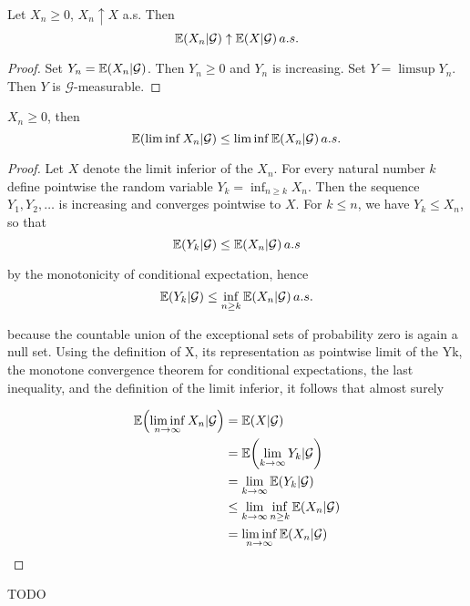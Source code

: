 \begin{thm}  Let $X_{n} \geq 0$,
  $X_{n} \uparrow X$ a.s.  Then
  \begin{equation}
    \label{exmp:general:7}
    \E{X_{n} | \mathcal{G}} \uparrow \E{X | \mathcal{G}} a.s.
  \end{equation} 
\end{thm}

\begin{proof}
  Set $Y_{n} = \E{X_{n} | \mathcal{G}}$.  Then $Y_{n} \geq 0$ and
    $Y_{n}$ is increasing.  Set $Y  = \limsup Y_{n}$.  Then $Y$ is
    $\mathcal{G}$-measurable.  
\end{proof}

\begin{thm}  $X_{n} \geq 0$, then
  \begin{equation}
    \label{exmp:general:8}
    \E{\liminf X_{n} | \mathcal{G}} \leq \liminf \E{X_{n} |
      \mathcal{G}} a.s.
  \end{equation}
\end{thm}

\begin{proof}
  Let $X$ denote the limit inferior of the $X_{n}$. For every natural number
  $k$ define pointwise the random variable $Y_k= \inf_{n \geq k} X_n$.
  Then the sequence $Y_{1}, Y_{2}, \dots$ is increasing and converges pointwise
  to $X$. For $k \leq n$, we have $Y_{k} \leq X_{n}$, so that 
  \begin{equation}
    \label{eq:6}
    \E{Y_k | \mathcal{G}} \leq \E{X_n | \mathcal{G}} a.s
  \end{equation}

  by the monotonicity of conditional expectation, hence
  \begin{equation}
    \label{eq:7}
    \E{Y_k|\mathcal{G}} \leq \inf_{n \geq k} \E{X_n | \mathcal{G}} a.s.
  \end{equation}

  because the countable union of the exceptional sets of probability
  zero is again a null set. Using the definition of X, its
  representation as pointwise limit of the Yk, the monotone convergence
  theorem for conditional expectations, the last inequality, and the
  definition of the limit inferior, it follows that almost surely

  \begin{align}
  \E{\liminf_{n \rightarrow \infty} X_{n} | \mathcal{G}} 
 & = \E{X |
    \mathcal{G}}                                         \\
 & = \E{\lim_{k \rightarrow \infty} Y_{k} | \mathcal{G}} \\
 & = \lim_{k \rightarrow \infty} \E{Y_{k} | \mathcal{G}} \\
 & \leq \lim_{k \rightarrow \infty} \inf_{n \geq k} \E{X_{n} |
    \mathcal{G}}                                         \\
 & = \liminf_{n \rightarrow \infty} \E{X_{n} | \mathcal{G}}
 \end{align}
\end{proof}


\begin{thm} TODO
  
\end{thm}


